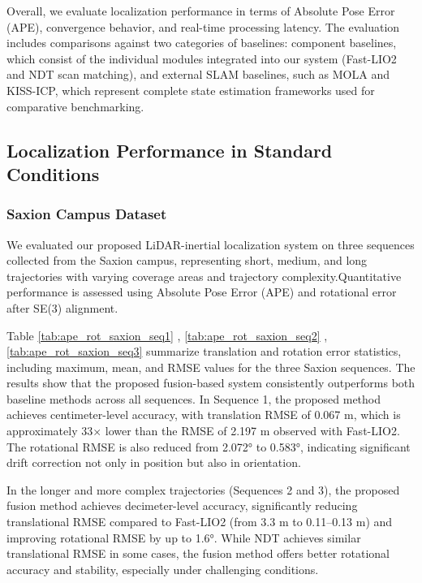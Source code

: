 Overall, we evaluate localization performance in terms of Absolute Pose Error (APE), convergence behavior, and real-time processing latency. The evaluation includes comparisons against two categories of baselines: component baselines, which consist of the individual modules integrated into our system (Fast-LIO2\cite{xuFastLIO2} and NDT\cite{biber2003ndt} scan matching), and external SLAM baselines, such as MOLA\cite{blanco2025mola_lo} and KISS-ICP\cite{kiss2025arxiv}, which represent complete state estimation frameworks used for comparative benchmarking.

\subsection{ Localization Performance in Standard Conditions}

\subsubsection{Saxion Campus Dataset}
We evaluated our proposed LiDAR-inertial localization system on three sequences collected from the Saxion campus, representing short, medium, and long trajectories with varying coverage areas and trajectory complexity.Quantitative performance is assessed using Absolute Pose Error (APE) and rotational error after SE(3) alignment.

 Table \ref{tab:ape_rot_saxion_seq1} , \ref{tab:ape_rot_saxion_seq2} , \ref{tab:ape_rot_saxion_seq3} summarize translation and rotation error statistics, including maximum, mean, and RMSE values for the three Saxion sequences. The results show that the proposed fusion-based system consistently outperforms both baseline methods across all sequences. In Sequence 1, the proposed method achieves centimeter-level accuracy, with  translation RMSE of 0.067 m, which is approximately 33× lower than the RMSE of 2.197 m observed with Fast-LIO2. The rotational RMSE is also reduced from 2.072° to 0.583°, indicating significant drift correction not only in position but also in orientation.

 In the longer and more complex trajectories (Sequences 2 and 3), the proposed fusion method achieves decimeter-level accuracy, significantly reducing translational RMSE compared to Fast-LIO2 (from 3.3 m to 0.11–0.13 m) and improving rotational RMSE by up to 1.6°. While NDT achieves similar translational RMSE in some cases, the fusion method offers better rotational accuracy and stability, especially under challenging conditions.
 
